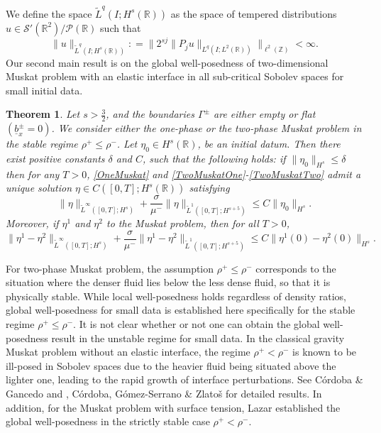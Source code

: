 \documentclass[12pt]{amsart}
\newtheorem{theorem}{Theorem}[section]
\theoremstyle{definition}
\numberwithin{equation}{section}
\newcommand{\wt}{\widetilde}
\newcommand{\R}{\mathbb{R}}
\newcommand{\Z}{\mathbb{Z}}
\newcommand{\f}{\frac}
\begin{document}
We define the space $\widetilde{L}^q(I; H^s(\R))$ as the space of tempered distributions $u \in \mathcal{S}' (\R^2)/ \mathcal{P}(\R)$ such that
\begin{equation*}
 \|u\|_{\widetilde{L}^q(I; H^s(\R))} : = \|2^{sj} \|P_j u \|_{L^q(I; L^2(\R))} \|_{\ell^2(\Z)} < \infty.
\end{equation*}
Our second main result is on the global well-posedness of  two-dimensional Muskat problem with an elastic interface in all sub-critical Sobolev spaces for small initial data.
 \begin{theorem}\label{t:global}
Let $s>\f32$, and the boundaries $\Gamma^\pm$ are either empty or flat $(\underline{b}^{\pm}_x = 0)$. 
We consider either the one-phase  or the  two-phase Muskat problem in the stable regime $\rho^+\leq \rho^-$. 
Let $\eta_0\in   H^s(\R)$, be an initial datum. Then there exist positive constants $\delta$ and $C$, such that the following holds: if $\| \eta_0\|_{H^s}\le \delta$ then for any $T>0$, \eqref{OneMuskat} and \eqref{TwoMuskatOne}-\eqref{TwoMuskatTwo} admit a unique solution $\eta\in C([0, T]; H^s (\R))$ satisfying
\begin{equation*}
\| \eta\|_{\wt L^\infty([0, T]; H^s)}+\frac{\sigma}{\mu^-} \| \eta\|_{\wt L^1([0, T];    H^{s+5})}\le C\| \eta_0\|_{H^s}.
\end{equation*}
 Moreover, if $\eta^1$ and $\eta^2$ to the Muskat problem, then for all $T>0$,
\begin{equation*}
\| \eta^1-\eta^2\|_{\wt L^\infty([0, T]; H^s)}+\frac{\sigma}{\mu^-} \| \eta^1-\eta^2\|_{\wt L^1([0, T]; H^{s+5})}\le C\| \eta^1(0)-\eta^2(0)\|_{H^s}.
\end{equation*}
\end{theorem}

For two-phase Muskat problem, the assumption $\rho^+ \leq  \rho^-$ corresponds to the situation where the  denser fluid lies below the less dense fluid, so that it is physically stable.
While local well-posedness holds regardless of density ratios, global well-posedness for small data is established here specifically for the stable regime $\rho^+ \leq  \rho^-$.
It is not clear whether or not one can obtain the global well-posedness result in the unstable regime for small data.
In the classical gravity Muskat problem without an elastic interface, the regime $\rho^+< \rho^-$ is known to be ill-posed in Sobolev spaces due to the heavier fluid being situated above the lighter one, leading to the rapid growth of interface perturbations.
See C\'ordoba \& Gancedo \cite{MR2318314} and \cite{MR2993754}, C\'ordoba, G\'omez-Serrano \& Zlato\v{s} \cite{MR3393318,MR3619874} for detailed results. 
In addition, for the Muskat problem with surface tension,  Lazar \cite{Lazar} established the global well-posedness in the strictly stable case $\rho^+<\rho^-$.
\end{document}

